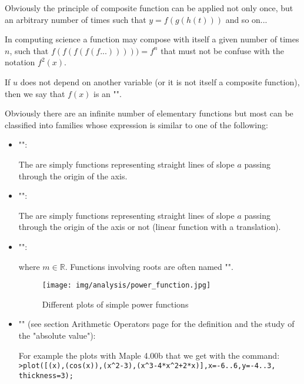 \begin{enumerate}
		Obviously the principle of composite function can be applied not only once, but an arbitrary number of times such that $y=f(g(h(t)))$ and so on...
		
		In computing science a function may compose with itself a given number of times $n$, such that $f(f(f(f(f...)))))=f^n$ that must not be confuse with the notation $f^2(x)$.
		
		If $u$ does not depend on another variable (or it is not itself a composite function), then we say that $f(x)$ is an "".

		Obviously there are an infinite number of elementary functions but most can be classified into families whose expression is similar to one of the following:
		
		\begin{itemize}
			\item "":
			
			The are simply functions representing straight lines of slope $a$ passing through the origin of the axis.
			
			\item "":
			
			The are simply functions representing straight lines of slope $a$ passing through the origin of the axis or not (linear function with a translation).
						
			\item "":
			
			where $m\in\mathbb{R}$. Functions involving roots are often named "".
			\begin{figure}[H]
				\centering
				\texttt{[image: img/analysis/power\_function.jpg]}
				\caption{Different plots of simple power functions}
			\end{figure}
		
			\item "" (see section Arithmetic Operators page \pageref{absolute value} for the definition and the study of the "absolute value"):
			
			For example the plots with Maple 4.00b that we get with the command:\\
			
			\texttt{>plot([(x),(cos(x)),(x\string^2-3),(x\string^3-4*x\string^2+2*x)],x=-6..6,y=-4..3,\\
			thickness=3);}	
			

\end{itemize}
\end{enumerate}

